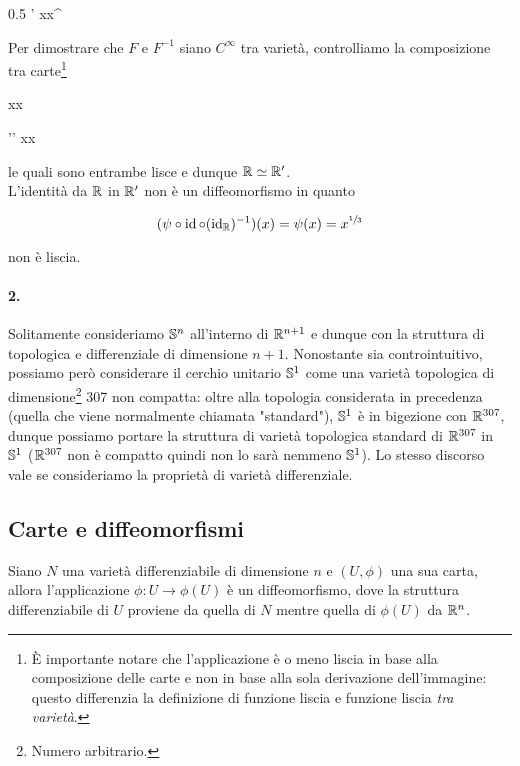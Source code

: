 	{0.5}{%
				{\R'}{\R}
				{x}{x^{}}
			}

Per dimostrare che $ F $ e $ F^{-1} $ siano $ C^{\infty} $ tra varietà, controlliamo la composizione tra carte\footnote{%
	È importante notare che l'applicazione è o meno liscia in base alla composizione delle carte e non in base alla sola derivazione dell'immagine: questo differenzia la definizione di funzione liscia e funzione liscia \textit{tra varietà}.%
}

	{\R}{\R}
	{x}{x}
	
	{\R'}{\R'}
	{x}{x}

le quali sono entrambe lisce e dunque $ \R \simeq \R' $.\\
L'identità da $ \R $ in $ \R' $ non è un diffeomorfismo in quanto

\begin{equation}
	(\psi \circ \id \circ (\id_{\R})^{-1})(x) = \psi(x) = x^{\sfrac{1}{3}}
\end{equation}

non è liscia.

\paragraph{2.}

Solitamente consideriamo $ \S^{n} $ all'interno di $ \R^{n+1} $ e dunque con la struttura di topologica e differenziale di dimensione $ n+1 $. Nonostante sia controintuitivo, possiamo però considerare il cerchio unitario $ \S^{1} $ come una varietà topologica di dimensione\footnote{%
	Numero arbitrario.%
} 307 non compatta: oltre alla topologia considerata in precedenza (quella che viene normalmente chiamata "standard"), $ \S^{1} $ è in bigezione con $ \R^{307} $, dunque possiamo portare la struttura di varietà topologica standard di $ \R^{307} $ in $ \S^{1} $ ($ \R^{307} $ non è compatto quindi non lo sarà nemmeno $ \S^{1} $). Lo stesso discorso vale se consideriamo la proprietà di varietà differenziale.

\subsection{Carte e diffeomorfismi}

\begin{definition}
	Siano $ N $ una varietà differenziabile di dimensione $ n $ e $ (U,\phi) $ una sua carta, allora l'applicazione $ \phi : U \to \phi(U) $ è un diffeomorfismo, dove la struttura differenziabile di $ U $ proviene da quella di $ N $ mentre quella di $ \phi(U) $ da $ \R^{n} $.
\end{definition}

